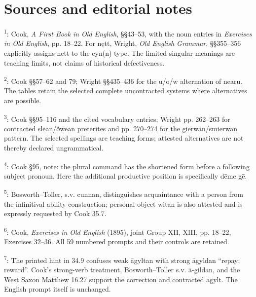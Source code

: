 \section*{Sources and editorial notes}

\begingroup\fontsize{10}{12.8}\selectfont
\setlength{\parskip}{1.5pt}
\textsuperscript{1}: Cook, \emph{A First Book in Old English}, §§43–53, with the noun entries in \emph{Exercises in Old English}, pp. 18–22. For nętt, Wright, \emph{Old English Grammar}, §§355–356 explicitly assigns nett to the cyn(n) type. The limited singular meanings are teaching limits, not claims of historical defectiveness.

\textsuperscript{2}: Cook §§57–62 and 79; Wright §§435–436 for the u/\allowbreak{}o/\allowbreak{}w alternation of nearu. The tables retain the selected complete uncontracted systems where alternatives are possible.

\textsuperscript{3}: Cook §§95–116 and the cited vocabulary entries; Wright pp. 262–263 for contracted slēan/\allowbreak{}ðwēan preterites and pp. 270–274 for the gierwan/\allowbreak{}smierwan pattern. The selected spellings are teaching forms; attested alternatives are not thereby declared ungrammatical.

\textsuperscript{4}: Cook §95, note: the plural command has the shortened form before a following subject pronoun. Here the additional productive position is specifically dēme gē.

\textsuperscript{5}: Bosworth–Toller, s.v. cunnan, distinguishes acquaintance with a person from the infinitival ability construction; personal-object witan is also attested and is expressly requested by Cook 35.7.

\textsuperscript{6}: Cook, \emph{Exercises in Old English} (1895), joint Group XII, XIII, pp. 18–22, Exercises 32–36. All 59 numbered prompts and their controls are retained.

\textsuperscript{7}: The printed hint in 34.9 confuses weak āgyltan with strong āgyldan “repay; reward”. Cook’s strong-verb treatment, Bosworth–Toller s.v. ā-gildan, and the West Saxon Matthew 16.27 support the correction and contracted āgylt. The English prompt itself is unchanged.

